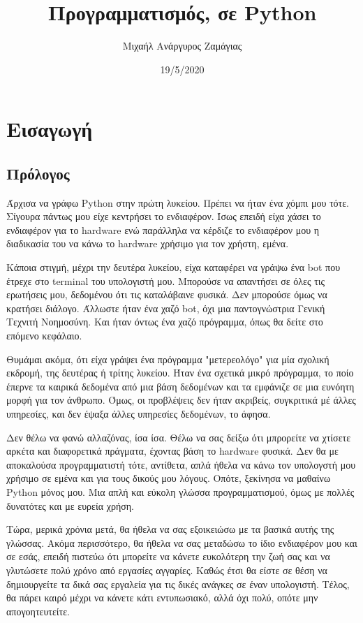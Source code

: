 \documentclass[a4paper,14pt]{extreport}
\title{Προγραμματισμός, σε Python}
\author{Μιχαήλ Ανάργυρος Ζαμάγιας}
\date{19/5/2020}
\begin{document}
\maketitle

\tableofcontents

\chapter{Εισαγωγή}
\newpage
\section{Πρόλογος}
Άρχισα να γράφω Python στην πρώτη λυκείου. Πρέπει να ήταν ένα χόμπι μου τότε. Σίγουρα πάντως μου είχε κεντρήσει το ενδιαφέρον. Ίσως επειδή είχα χάσει το ενδιαφέρον για το hardware ενώ παράλληλα να κέρδιζε το ενδιαφέρον μου η διαδικασία του να κάνω το hardware χρήσιμο για τον χρήστη, εμένα.

Κάποια στιγμή, μέχρι την δευτέρα λυκείου, είχα καταφέρει να γράψω ένα bot που έτρεχε στο terminal του υπολογιστή μου. Μπορούσε να απαντήσει σε όλες τις ερωτήσεις μου, δεδομένου ότι τις καταλάβαινε φυσικά. Δεν μπορούσε όμως να κρατήσει διάλογο. Άλλωστε ήταν ένα χαζό bot, όχι μια παντογνώστρια Γενική Τεχνιτή Νοημοσύνη. Και ήταν όντως ένα χαζό πρόγραμμα, όπως θα δείτε στο επόμενο κεφάλαιο.

Θυμάμαι ακόμα, ότι είχα γράψει ένα πρόγραμμα "μετερεολόγο" για μία σχολική εκδρομή, της δευτέρας ή τρίτης λυκείου. Ήταν ένα σχετικά μικρό πρόγραμμα, το  ποίο έπερνε τα καιρικά δεδομένα από μια βάση δεδομένων και τα εμφάνιζε σε μια ευνόητη μορφή για τον άνθρωπο. Όμως, οι προβλέψεις δεν ήταν ακριβείς, συγκριτικά μέ άλλες υπηρεσίες, και δεν έψαξα άλλες υπηρεσίες δεδομένων, το άφησα.

Δεν θέλω να φανώ αλλαζόνας, ίσα ίσα. Θέλω να σας δείξω ότι μπρορείτε να χτίσετε αρκέτα και διαφορετικά πράγματα, έχοντας βάση το hardware φυσικά. Δεν θα με αποκαλούσα προγραμματιστή τότε, αντίθετα, απλά ήθελα να κάνω τον υπολογστή μου χρήσιμο σε εμένα και για τους δικούς μου λόγους. Οπότε, ξεκίνησα να μαθαίνω Python μόνος μου. Μια απλή και εύκολη γλώσσα προγραμματισμού, όμως με πολλές δυνατότες και με ευρεία χρήση.

Τώρα, μερικά χρόνια μετά, θα ήθελα να σας εξοικειώσω με τα βασικά αυτής της  γλώσσας. Ακόμα περισσότερο, θα ήθελα να σας μεταδώσω το ίδιο ενδιαφέρον μου και σε εσάς, επειδή πιστεύω ότι μπορείτε να κάνετε ευκολότερη την ζωή σας και να γλυτώσετε πολύ χρόνο από εργασίες αγγαρίες. Καθώς έτσι θα είστε σε θέση να δημιουργείτε τα δικά σας εργαλεία για τις δικές ανάγκες σε έναν υπολογιστή. Τέλος, θα πάρει καιρό μέχρι να κάνετε κάτι εντυπωσιακό, αλλά όχι πολύ, οπότε μην απογοητευτείτε.
\end{document}
